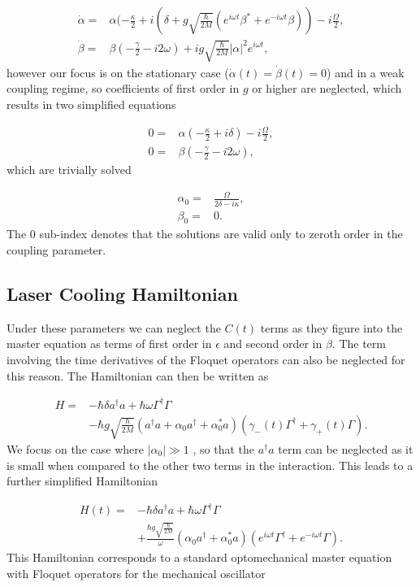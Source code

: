 \documentclass[reprint, amsmath,amssymb, aps,pra]{revtex4-1}
\begin{document}
\begin{align}
\dot{\alpha} =& \alpha(-\frac{\kappa}{2}+i(\delta+g\sqrt{\frac{\hbar}{2M}}(e^{i\omega t} \beta^* + e^{-i\omega t} \beta))-i\frac{\Omega}{2},\\
\dot{\beta} =& \beta(-\frac{\gamma}{2}-i 2\omega)+ig\sqrt{\frac{\hbar}{2M}}|\alpha|^2e^{i\omega t},
\end{align}
however our focus is on the stationary case
($\dot{\alpha}(t)=\dot{\beta}(t)=0$) and in a weak coupling regime, so
coefficients of first order in $g$ or higher are neglected, which
results in two simplified equations

\begin{align}
0 =& \alpha(-\frac{\kappa}{2}+i\delta)-i\frac{\Omega}{2},\\
0 =& \beta(-\frac{\gamma}{2}-i 2\omega),
\end{align} which are trivially solved 

\begin{align}
\alpha_0 =& \frac{\Omega}{2\delta-i\kappa},\\
\beta_0 =& 0.
\end{align} The 0 sub-index denotes that the solutions are valid only to zeroth order in the coupling parameter. 

\subsection{Laser Cooling Hamiltonian}

Under these parameters we can neglect the $C(t)$ terms as they
figure into the
master equation as terms of first order in $\epsilon$ and second order
in $\beta$. The term involving the time derivatives of the Floquet
operators can also be neglected for this reason. The Hamiltonian can
then be written as

\begin{align}
H =& -\hbar \delta a^{\dagger}a +\hbar\omega\Gamma^{\dagger}\Gamma \\
&-\hbar g\sqrt{\frac{\hbar}{2M}}(a^{\dagger}a +\alpha_0 a^{\dagger}+\alpha^*_0 a)(\gamma_-(t)\Gamma^{\dagger}+\gamma_+(t)\Gamma)\nonumber.
\end{align} We focus on the case where $|\alpha_0| \gg 1$
\cite{BarberisLC}, so that the $a^\dagger a$ term can be neglected as
it is small when compared to the other two terms in the interaction.
This leads to a further simplified Hamiltonian

\begin{align} \label{LCHamiltonian}
H(t) =& -\hbar \delta a^{\dagger}a +\hbar\omega\Gamma^{\dagger}\Gamma \\
&+\frac{\hbar g\sqrt{\frac{\hbar}{2M}}}{\omega}(\alpha_0 a^{\dagger}+\alpha^*_0 a)(e^{i\omega t} \nonumber\Gamma^{\dagger}+e^{-i\omega t}\Gamma).
\end{align}
This Hamiltonian corresponds to a standard optomechanical master
equation with Floquet operators for the mechanical oscillator
\end{document}
